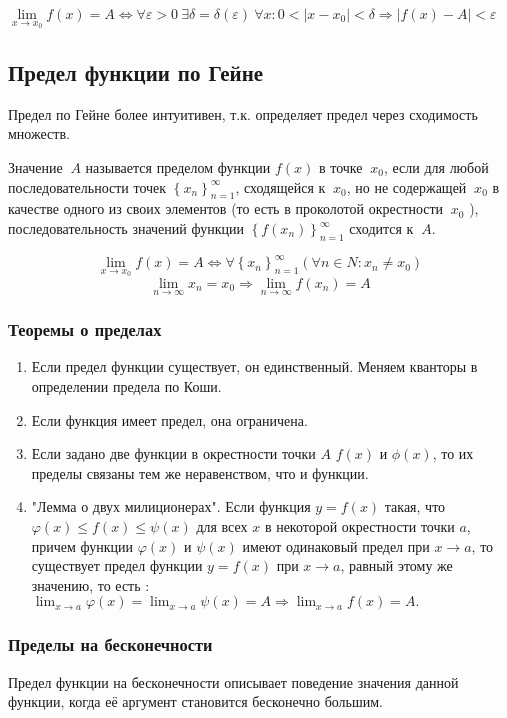 $\lim\limits_{x \to x_0} f \left( x \right) = A \Leftrightarrow \forall \varepsilon > 0 ~ \exists \delta = \delta \left( \varepsilon \right) ~ \forall x \colon 0 < \left| x - x_0 \right| < \delta \Rightarrow \left| f \left( x \right) - A \right| < \varepsilon$

\subsection{Предел функции по Гейне}

Предел по Гейне более интуитивен, т.к. определяет предел через сходимость множеств.

Значение $~A$ называется пределом функции $f \left( x \right)$ в точке $~x_0$, если для любой последовательности точек $\left\{ x_n \right\}_{n=1}^{\infty}$, сходящейся к $~x_0$, но не содержащей $~x_0$ в качестве одного из своих элементов (то есть в проколотой окрестности $~x_0$ ), последовательность значений функции $\left\{ f \left( x_n \right) \right\}_{n=1}^{\infty}$ сходится к $~A$.

$$
\lim\limits_{x \to x_0} f \left( x \right) = A \Leftrightarrow \forall \left\{ x_n \right\}_{n = 1}^{\infty} \left( \forall n \in N \colon x_n \neq x_0 \right) 
$$
$$
\lim\limits_{n \to \infty} x_n = x_0 \Rightarrow \lim_{n \to \infty} f \left( x_n \right) = A
$$

\subsubsection{Теоремы о пределах}

\begin{enumerate}
\item 
Если предел функции существует, он единственный.
Меняем кванторы в определении предела по Коши.

\item 
Если функция имеет предел, она ограничена.

\item 
Если задано две функции в окрестности точки $ A $ $ f(x) $ и $ \phi(x) $,
то их пределы связаны тем же неравенством, что и функции.

\item
"Лемма о двух милиционерах". Если функция $y=f(x)$ такая, что $\varphi(x)\leqslant f(x)\leqslant\psi(x)$ для всех $x$ в некоторой окрестности точки $a$, причем функции $\varphi(x)$ и $\psi(x)$ имеют одинаковый предел при $x\to a$, то существует предел функции $y=f(x)$ при $x\to a$, равный этому же значению, то есть
: $\lim_{x\to a}\varphi(x)=\lim_{x\to a}\psi(x)=A\Rightarrow\lim_{x\to a}f(x)=A.$
\end{enumerate}


\subsubsection{Пределы на бесконечности}

Предел функции на бесконечности описывает поведение значения данной функции, когда её аргумент становится бесконечно большим.




